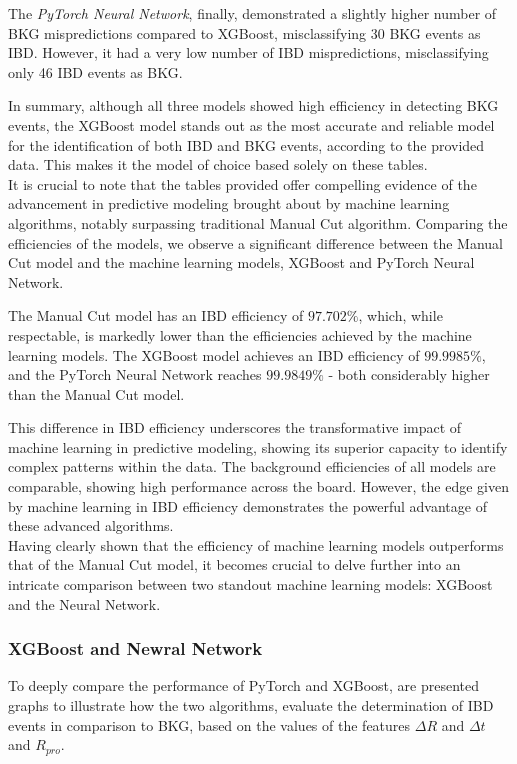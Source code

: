 The \textit{PyTorch Neural Network}, finally, demonstrated a slightly higher number of BKG mispredictions compared to XGBoost, misclassifying 30 BKG events as IBD. However, it had a very low number of IBD mispredictions, misclassifying only 46 IBD events as BKG.

In summary, although all three models showed high efficiency in detecting BKG events, the XGBoost model stands out as the most accurate and reliable model for the identification of both IBD and BKG events, according to the provided data. This makes it the model of choice based solely on these tables.\\



It is crucial to note that the tables provided offer compelling evidence of the advancement in predictive modeling brought about by machine learning algorithms, notably surpassing traditional Manual Cut algorithm. Comparing the efficiencies of the models, we observe a significant difference between the Manual Cut model and the machine learning models, XGBoost and PyTorch Neural Network.

The Manual Cut model has an IBD efficiency of $97.702\%$, which, while respectable, is markedly lower than the efficiencies achieved by the machine learning models. The XGBoost model achieves an IBD efficiency of $99.9985\%$, and the PyTorch Neural Network reaches $99.9849\%$ - both considerably higher than the Manual Cut model.

This difference in IBD efficiency underscores the transformative impact of machine learning in predictive modeling, showing its superior capacity to identify complex patterns within the data. The background efficiencies of all models are comparable, showing high performance across the board. However, the edge given by machine learning in IBD efficiency demonstrates the powerful advantage of these advanced algorithms.\\

Having clearly shown that the efficiency of machine learning models outperforms that of the Manual Cut model, it becomes crucial to delve further into an intricate comparison between two standout machine learning models: XGBoost and the Neural Network.
\subsubsection{XGBoost and Newral Network}
To deeply compare the performance of PyTorch and XGBoost, are presented graphs to illustrate how the two algorithms, evaluate the determination of IBD events in comparison to BKG, based on the values of the features $\Delta R$ and $\Delta t$ and $R_{pro}$.

